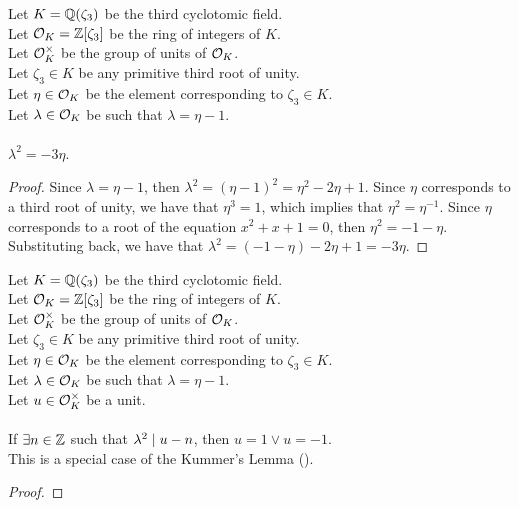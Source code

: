 \begin{lemma}
    \label{lmm:lambda_sq}
    \leanok
    Let $K = \mathbb{Q}(\zeta_3)$ be the third cyclotomic field. \\
    Let $\mathcal{O}_K = \mathbb{Z}[\zeta_3]$ be the ring of integers of $K$. \\
    Let $\mathcal{O}^\times_K$ be the group of units of $\mathcal{O}_K$. \\
    Let $\zeta_3 \in K$ be any primitive third root of unity. \\
    Let $\eta \in \mathcal{O}_K$ be the element corresponding to $\zeta_3 \in K$. \\
    Let $\lambda \in \mathcal{O}_K$ be such that $\lambda = \eta -1$. \\\\
    $\lambda^2 = -3 \eta$.
\end{lemma}
\begin{proof}
    \leanok
    Since $\lambda = \eta -1$, then $\lambda^2 = (\eta - 1)^2 = \eta^2 - 2\eta + 1$.
    Since $\eta$ corresponds to a third root of unity, we have that $\eta^3 = 1$,
    which implies that $\eta^2 = \eta^{-1}$.
    Since $\eta$ corresponds to a root of the equation $x^2 + x + 1 = 0$, then $\eta^2 = -1 - \eta$.
    Substituting back, we have that $\lambda^2 = (-1 - \eta) - 2\eta + 1 = -3\eta$.
\end{proof}

\begin{theorem}
    \label{lmm:eq_one_or_neg_one_of_unit_of_congruent}
    \leanok
    Let $K = \mathbb{Q}(\zeta_3)$ be the third cyclotomic field. \\
    Let $\mathcal{O}_K = \mathbb{Z}[\zeta_3]$ be the ring of integers of $K$. \\
    Let $\mathcal{O}^\times_K$ be the group of units of $\mathcal{O}_K$. \\
    Let $\zeta_3 \in K$ be any primitive third root of unity. \\
    Let $\eta \in \mathcal{O}_K$ be the element corresponding to $\zeta_3 \in K$. \\
    Let $\lambda \in \mathcal{O}_K$ be such that $\lambda = \eta -1$. \\
    Let $u \in \mathcal{O}^\times_K$ be a unit. \\\\
    If $\exists n \in \mathbb{Z}$ such that $\lambda^2 \mid u - n$, then
    $u = 1 \lor u = -1$. \\
    This is a special case of the Kummer's Lemma ().
\end{theorem}
\begin{proof}
    \leanok
\end{proof}

